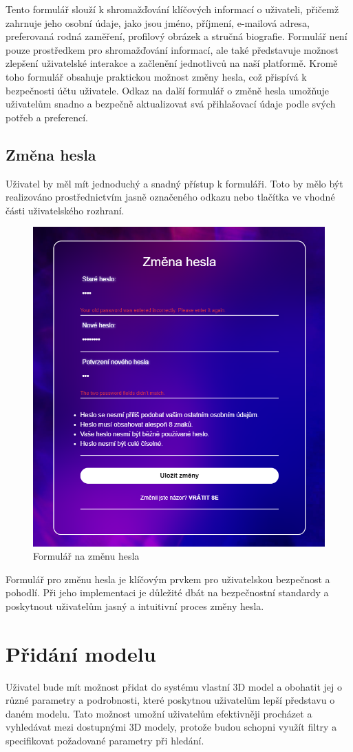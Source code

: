 \documentclass[12pt, a4paper,
twoside,        %
openright
]{report}
\begin{document}
Tento formulář slouží k shromažďování klíčových informací o uživateli, přičemž zahrnuje jeho osobní údaje, jako jsou jméno, příjmení, e-mailová adresa, preferovaná rodná zaměření, profilový obrázek a stručná biografie. Formulář není pouze prostředkem pro shromažďování informací, ale také představuje možnost zlepšení uživatelské interakce a začlenění jednotlivců na naší platformě. Kromě toho formulář obsahuje praktickou možnost změny hesla, což přispívá k bezpečnosti účtu uživatele. Odkaz na další formulář o změně hesla umožňuje uživatelům snadno a bezpečně aktualizovat svá přihlašovací údaje podle svých potřeb a preferencí.
\subsection[Změna hesla]{Změna hesla}
Uživatel by měl mít jednoduchý a snadný přístup k formuláři. Toto by mělo být realizováno prostřednictvím jasně označeného odkazu nebo tlačítka ve vhodné části uživatelského rozhraní.

\begin{figure}[h]
			\centering
			\includegraphics[width=0.5\linewidth]{image/change-password.png} 
			\caption{Formulář na změnu hesla}
		\end{figure}
		Formulář pro změnu hesla je klíčovým prvkem pro uživatelskou bezpečnost a pohodlí. Při jeho implementaci je důležité dbát na bezpečnostní standardy a poskytnout uživatelům jasný a intuitivní proces změny hesla.
		\newpage
	\section[Přidání modelu]{Přidání modelu}
	Uživatel bude mít možnost přidat do systému vlastní 3D model a obohatit jej o různé parametry a podrobnosti, které poskytnou uživatelům lepší představu o daném modelu. Tato možnost umožní uživatelům efektivněji procházet a vyhledávat mezi dostupnými 3D modely, protože budou schopni využít filtry a specifikovat požadované parametry při hledání.
	
\end{document}
